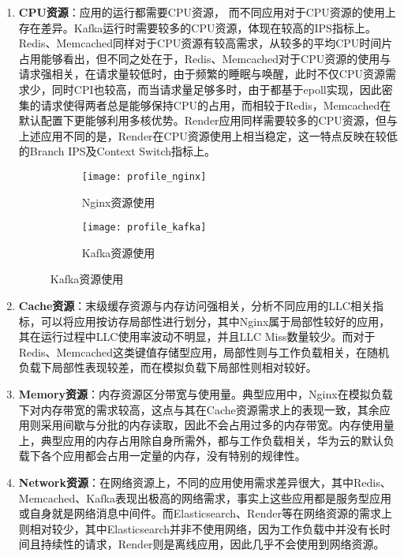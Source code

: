 \begin{enumerate}
    \item \textbf{CPU资源}：应用的运行都需要CPU资源， 而不同应用对于CPU资源的使用上存在差异。Kafka运行时需要较多的CPU资源，体现在较高的IPS指标上。Redis、Memcached同样对于CPU资源有较高需求，从较多的平均CPU时间片占用能够看出，但不同之处在于，Redis、Memcached对于CPU资源的使用与请求强相关，在请求量较低时，由于频繁的睡眠与唤醒，此时不仅CPU资源需求少，同时CPI也较高，而当请求量足够多时，由于都基于epoll实现，因此密集的请求使得两者总是能够保持CPU的占用，而相较于Redis，Memcached在默认配置下更能够利用多核优势。Render应用同样需要较多的CPU资源，但与上述应用不同的是，Render在CPU资源使用上相当稳定，这一特点反映在较低的Branch IPS及Context Switch指标上。

\begin{figure}[H]
    \centering
    \begin{subfigure}[b]{0.85\textwidth}
      \texttt{[image: profile\_nginx]}
      \caption{Nginx资源使用}
      \label{fig:profile_nginx}
    \end{subfigure}
    \begin{subfigure}[b]{0.85\textwidth}
        \texttt{[image: profile\_kafka]}
        \caption{Kafka资源使用}
        \label{fig:profile_kafka}
    \end{subfigure}
\label{fig:resource_affinity_1}
\end{figure}


    \item \textbf{Cache资源}：末级缓存资源与内存访问强相关，分析不同应用的LLC相关指标，可以将应用按访存局部性进行划分，其中Nginx属于局部性较好的应用，其在运行过程中LLC使用率波动不明显，并且LLC Miss数量较少。而对于Redis、Memcached这类键值存储型应用，局部性则与工作负载相关，在随机负载下局部性表现较差，而在模拟负载下局部性则相对较好。
    
    \item \textbf{Memory资源}：内存资源区分带宽与使用量。典型应用中，Nginx在模拟负载下对内存带宽的需求较高，这点与其在Cache资源需求上的表现一致，其余应用则采用间歇与分批的内存读取，因此不会占用过多的内存带宽。内存使用量上，典型应用的内存占用除自身所需外，都与工作负载相关，华为云的默认负载下各个应用都会占用一定量的内存，没有特别的规律性。
    
    \item \textbf{Network资源}：在网络资源上，不同的应用使用需求差异很大，其中Redis、Memcached、Kafka表现出极高的网络需求，事实上这些应用都是服务型应用或自身就是网络消息中间件。而Elasticsearch、Render等在网络资源的需求上则相对较少，其中Elasticsearch并非不使用网络，因为工作负载中并没有长时间且持续性的请求，Render则是离线应用，因此几乎不会使用到网络资源。


\end{enumerate}
